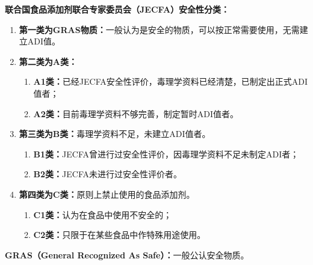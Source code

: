 \begin{defbox}
\textbf{联合国食品添加剂联合专家委员会（JECFA）安全性分类：}

\begin{enumerate}[leftmargin=*]
    \item \textbf{第一类为GRAS物质：}一般认为是安全的物质，可以按正常需要使用，无需建立ADI值。
    \item \textbf{第二类为A类：}
    \begin{enumerate}[leftmargin=*]
        \item \textbf{A1类：}已经JECFA安全性评价，毒理学资料已经清楚，已制定出正式ADI值者；
        \item \textbf{A2类：}目前毒理学资料不够完善，制定暂时ADI值者。
    \end{enumerate}
    \item \textbf{第三类为B类：}毒理学资料不足，未建立ADI值者。
    \begin{enumerate}[leftmargin=*]
        \item \textbf{B1类：}JECFA曾进行过安全性评价，因毒理学资料不足未制定ADI者；
        \item \textbf{B2类：}JECFA未进行过安全性评价者。
    \end{enumerate}
    \item \textbf{第四类为C类：}原则上禁止使用的食品添加剂。
    \begin{enumerate}[leftmargin=*]
        \item \textbf{C1类：}认为在食品中使用不安全的；
        \item \textbf{C2类：}只限于在某些食品中作特殊用途使用。
    \end{enumerate}
\end{enumerate}
\end{defbox}

\begin{tipbox}
\textbf{GRAS（General Recognized As Safe）：}一般公认安全物质。
\end{tipbox}

